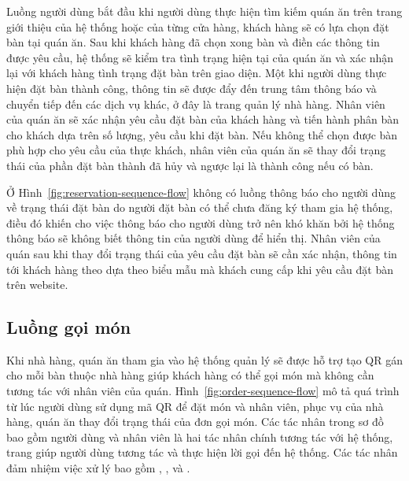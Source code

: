 Luồng người dùng bắt đầu khi người dùng thực hiện tìm kiếm quán ăn trên trang giới thiệu của hệ thống hoặc của từng cửa hàng, khách hàng sẽ có lựa chọn đặt bàn tại quán ăn.
Sau khi khách hàng đã chọn xong bàn và điền các thông tin được yêu cầu, hệ thống sẽ kiểm tra tình trạng hiện tại của quán ăn và xác nhận lại với khách hàng tình trạng đặt bàn trên giao diện.
Một khi người dùng thực hiện đặt bàn thành công, thông tin sẽ được đẩy đến trung tâm thông báo và chuyển tiếp đến các dịch vụ khác, ở đây là trang quản lý nhà hàng. 
Nhân viên của quán ăn sẽ xác nhận yêu cầu đặt bàn của khách hàng và tiến hành phân bàn cho khách dựa trên số lượng, yêu cầu khi đặt bàn.
Nếu không thể chọn được bàn phù hợp cho yêu cầu của thực khách, nhân viên của quán ăn sẽ thay đổi trạng thái của phần đặt bàn thành đã hủy và ngược lại là thành công nếu có bàn.

Ở Hình~\ref{fig:reservation-sequence-flow} không có luồng thông báo cho người dùng về trạng thái đặt bàn do người đặt bàn có thể chưa đăng ký tham gia hệ thống, điều đó khiến cho việc thông báo cho người dùng trở nên khó khăn bởi hệ thống thông báo sẽ không biết thông tin của người dùng để hiển thị.
Nhân viên của quán sau khi thay đổi trạng thái của yêu cầu đặt bàn sẽ cần xác nhận, thông tin tới khách hàng theo dựa theo biểu mẫu mà khách cung cấp khi yêu cầu đặt bàn trên website.
\subsection{Luồng gọi món}\label{sec:order-sequence-flow}
Khi nhà hàng, quán ăn tham gia vào hệ thống quản lý sẽ được hỗ trợ tạo QR gán cho mỗi bàn thuộc nhà hàng giúp khách hàng có thể gọi món mà không cần tương tác với nhân viên của quán.
Hình~\ref{fig:order-sequence-flow} mô tả quá trình từ lúc người dùng sử dụng mã QR để đặt món và nhân viên, phục vụ của nhà hàng, quán ăn thay đổi trạng thái của đơn gọi món.
Các tác nhân trong sơ đồ bao gồm người dùng và nhân viên là hai tác nhân chính tương tác với hệ thống, trang  giúp người dùng tương tác và thực hiện lời gọi đến hệ thống.
Các tác nhân đảm nhiệm việc xử lý bao gồm , , và .

